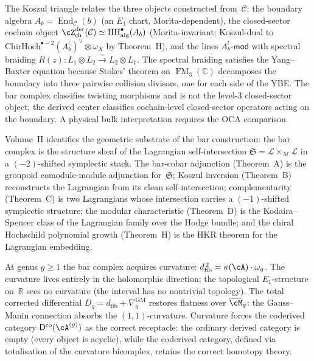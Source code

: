 The Koszul triangle relates the three objects constructed
from~$\mathcal C$: the boundary algebra
$A_b=\operatorname{End}_{\mathcal C}(b)$ (an $E_1$ chart, Morita-dependent),
the closed-sector cochain object
$\cZ^{\mathrm{der}}_{\mathrm{ch}}(\mathcal C)\simeq
\operatorname{HH}^\bullet_{\mathrm{alg}}(A_b)$
(Morita-invariant; Koszul-dual to
$\mathrm{ChirHoch}^{\bullet-2}(A_b^!)^\vee\otimes\omega_X$
by Theorem~H), and the lines
$A_b^!\text{-}\mathsf{mod}$ with spectral braiding
$R(z)\colon L_1\otimes L_2\xrightarrow{\sim}L_2\otimes L_1$.
The spectral braiding satisfies the Yang--Baxter equation because
Stokes' theorem on $\operatorname{FM}_3(\mathbb C)$ decomposes
the boundary into three pairwise collision divisors, one for each side
of the YBE. The bar complex classifies twisting morphisms and is not
the level-$3$ closed-sector object; the derived center classifies
cochain-level closed-sector operators acting on the boundary.  A
physical bulk interpretation requires the OCA comparison.

Volume~II identifies the geometric substrate of the bar construction:
the bar complex is the structure sheaf of the Lagrangian
self-intersection
$\mathfrak{S}=\mathcal{L}\times_{\mathcal{M}}\mathcal{L}$
in a $(-2)$-shifted symplectic stack. The bar-cobar adjunction
(Theorem~A) is the groupoid comodule-module adjunction for~$\mathfrak{S}$;
Koszul inversion (Theorem~B) reconstructs the Lagrangian from its clean
self-intersection; complementarity (Theorem~C) is two Lagrangians whose
intersection carries a $(-1)$-shifted symplectic structure; the modular
characteristic (Theorem~D) is the Kodaira--Spencer class of the
Lagrangian family over the Hodge bundle; and the chiral Hochschild polynomial
growth (Theorem~H) is the HKR theorem for the Lagrangian embedding.

At genus $g\ge 1$ the bar complex acquires curvature:
$d_{\mathrm{fib}}^{\,2}=\kappa(\cA)\cdot\omega_g$. The curvature lives
entirely in the holomorphic direction; the topological $E_1$-structure
on~$\mathbb R$ sees no curvature (the interval has no nontrivial
topology). The total corrected differential
$D_g=d_{\mathrm{fib}}+\nabla^{\mathrm{GM}}_g$ restores flatness over
$\overline{\cM}_g$: the Gauss--Manin connection absorbs the
$(1,1)$-curvature. Curvature forces the coderived category
$\mathsf{D}^{\mathrm{co}}(\cA^{(g)})$ as the correct receptacle: the
ordinary derived category is empty (every object is acyclic), while the
coderived category, defined via totalisation of the curvature bicomplex,
retains the correct homotopy theory.

